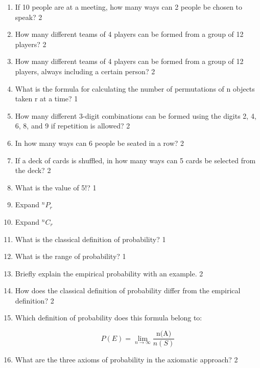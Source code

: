 \documentclass[a4paper,oneside, margin=1.4in]{book}
\begin{document}
\begin{enumerate}
\item If 10 people are at a meeting, how many ways can 2 people be chosen to speak? \hfill 2

\item How many different teams of 4 players can be formed from a group of 12 players? \hfill 2

\item How many different teams of 4 players can be formed from a group of 12 players, always including a certain person? \hfill 2

\item What is the formula for calculating the number of permutations of n objects taken r at a time? \hfill 1

\item How many different 3-digit combinations can be formed using the digits 2, 4, 6, 8, and 9 if repetition is allowed? \hfill 2

\item In how many ways can 6 people be seated in a row? \hfill 2

\item If a deck of cards is shuffled, in how many ways can 5 cards be selected from the deck? \hfill 2

\item What is the value of 5!? \hfill 1

\item Expand ${}^nP_r$

\item Expand ${}^nC_r$

\item What is the classical definition of probability? \hfill 1

\item What is the range of probability? \hfill 1

\item Briefly explain the empirical probability with an example. \hfill 2

\item How does the classical definition of probability differ from the empirical definition? \hfill 2

\item Which definition of probability does this formula belong to: 

\[
P(E) = \lim_{n \to \infty} \frac{\text{n(A)}}{n(S)}
\]

\item What are the three axioms of probability in the axiomatic approach? \hfill 2


\end{enumerate}
\end{document}
